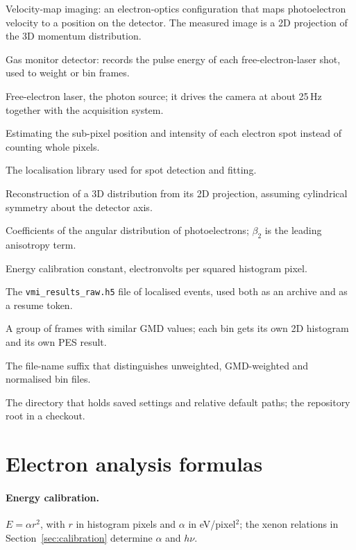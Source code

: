 \documentclass[11pt,a4paper]{article}
\newcommand{\code}[1]{\texttt{#1}}
\begin{document}
\begin{description}[leftmargin=0pt]
  \item[VMI] Velocity-map imaging: an electron-optics configuration that maps
    photoelectron velocity to a position on the detector. The measured image
    is a 2D projection of the 3D momentum distribution.
  \item[GMD] Gas monitor detector: records the pulse energy of each
    free-electron-laser shot, used to weight or bin frames.
  \item[FEL] Free-electron laser, the photon source; it drives the camera at
    about 25\,Hz together with the acquisition system.
  \item[Centroiding] Estimating the sub-pixel position and intensity of each
    electron spot instead of counting whole pixels.
  \item[Picasso] The localisation library used for spot detection and fitting.
  \item[Abel inversion] Reconstruction of a 3D distribution from its 2D
    projection, assuming cylindrical symmetry about the detector axis.
  \item[$\beta$ parameters] Coefficients of the angular distribution of
    photoelectrons; $\beta_2$ is the leading anisotropy term.
  \item[$\alpha$] Energy calibration constant, electronvolts per squared
    histogram pixel.
  \item[Checkpoint] The \code{vmi\_\allowbreak{}results\_\allowbreak{}raw.\allowbreak{}h5} file of localised
    events, used both as an archive and as a resume token.
  \item[GMD bin] A group of frames with similar GMD values; each bin gets its
    own 2D histogram and its own PES result.
  \item[Weight suffix] The file-name suffix that distinguishes unweighted,
    GMD-weighted and normalised bin files.
  \item[Workspace] The directory that holds saved settings and relative
    default paths; the repository root in a checkout.
\end{description}

\section{Electron analysis formulas}
\label{sec:formulas}

\paragraph{Energy calibration.} $E = \alpha r^2$, with $r$ in histogram
pixels and $\alpha$ in eV/pixel$^2$; the xenon relations in
Section~\ref{sec:calibration} determine $\alpha$ and $h\nu$.
\end{document}
